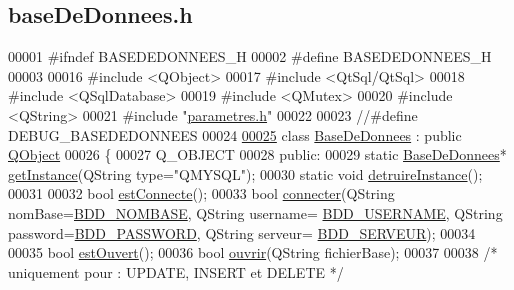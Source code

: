 \hypertarget{base_de_donnees_8h_source}{}\subsection{base\+De\+Donnees.\+h}
\label{base_de_donnees_8h_source}

\begin{DoxyCode}
00001 \textcolor{preprocessor}{#ifndef BASEDEDONNEES\_H}
00002 \textcolor{preprocessor}{#define BASEDEDONNEES\_H}
00003 
00016 \textcolor{preprocessor}{#include <QObject>}
00017 \textcolor{preprocessor}{#include <QtSql/QtSql>}
00018 \textcolor{preprocessor}{#include <QSqlDatabase>}
00019 \textcolor{preprocessor}{#include <QMutex>}
00020 \textcolor{preprocessor}{#include <QString>}
00021 \textcolor{preprocessor}{#include "\hyperlink{parametres_8h}{parametres.h}"}
00022 
00023 \textcolor{comment}{//#define DEBUG\_BASEDEDONNEES}
00024 
\hyperlink{class_base_de_donnees}{00025} \textcolor{keyword}{class }\hyperlink{class_base_de_donnees}{BaseDeDonnees} : \textcolor{keyword}{public} \hyperlink{class_q_object}{QObject}
00026 \{
00027     Q\_OBJECT
00028     \textcolor{keyword}{public}:
00029         \textcolor{keyword}{static} \hyperlink{class_base_de_donnees}{BaseDeDonnees}* \hyperlink{class_base_de_donnees_a80028aa2b6b4fbf30fb2e36357b7d3d3}{getInstance}(QString type=\textcolor{stringliteral}{"QMYSQL"});
00030         \textcolor{keyword}{static} \textcolor{keywordtype}{void} \hyperlink{class_base_de_donnees_a457401c0816b888c77ce915997545f4e}{detruireInstance}();
00031 
00032         \textcolor{keywordtype}{bool} \hyperlink{class_base_de_donnees_a00388973f3ec42e5c8e76e7af7e124b2}{estConnecte}();
00033         \textcolor{keywordtype}{bool} \hyperlink{class_base_de_donnees_ac20da193923a9bfea5e38ee5a54820cd}{connecter}(QString nomBase=\hyperlink{parametres_8h_a45f8f15b8f9a7ab4c2b219038ff64f6b}{BDD\_NOMBASE}, QString username=
      \hyperlink{parametres_8h_a88b5f5b81fa534553c68802384beff2c}{BDD\_USERNAME}, QString password=\hyperlink{parametres_8h_ae2ded9166ed2553182545e97514c04f7}{BDD\_PASSWORD}, QString serveur=
      \hyperlink{parametres_8h_a423559dc987673b8aacaa9f369839bb0}{BDD\_SERVEUR});
00034         
00035         \textcolor{keywordtype}{bool} \hyperlink{class_base_de_donnees_af9ac332082ffd0dd35e412cefabe5e9c}{estOuvert}();
00036         \textcolor{keywordtype}{bool} \hyperlink{class_base_de_donnees_a7f6a5510b08017b0d99115a84252f186}{ouvrir}(QString fichierBase);
00037 
00038         \textcolor{comment}{/* uniquement pour : UPDATE, INSERT et DELETE */}

\end{DoxyCode}
